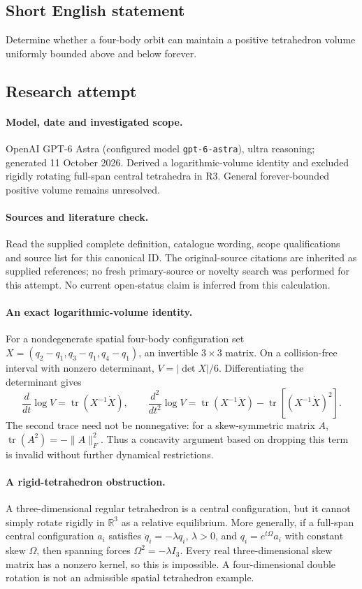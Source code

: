 \documentclass[11pt]{article}
\begin{document}
\subsection{Short English statement}
Determine whether a four-body orbit can maintain a positive tetrahedron volume uniformly bounded above and below forever.
\subsection{Research attempt}
\paragraph{Model, date and investigated scope.}
OpenAI GPT-6 Astra (configured model \texttt{gpt-6-astra}), ultra reasoning; generated 11 October 2026. Derived a logarithmic-volume identity and excluded rigidly rotating full-span central tetrahedra in R3. General forever-bounded positive volume remains unresolved.

\paragraph{Sources and literature check.}
Read the supplied complete definition, catalogue wording, scope qualifications and source list for this canonical ID. The original-source citations are inherited as supplied references; no fresh primary-source or novelty search was performed for this attempt. No current open-status claim is inferred from this calculation.

\paragraph{An exact logarithmic-volume identity.}For a nondegenerate spatial four-body configuration set \(X=(q_2-q_1,q_3-q_1,q_4-q_1)\), an invertible \(3\times3\) matrix. On a collision-free interval with nonzero determinant, \(V=|\det X|/6\). Differentiating the determinant gives
\[\frac{d}{dt}\log V=\operatorname{tr}(X^{-1}\dot X),\qquad
\frac{d^2}{dt^2}\log V=\operatorname{tr}(X^{-1}\ddot X)-\operatorname{tr}[(X^{-1}\dot X)^2].
\]
The second trace need not be nonnegative: for a skew-symmetric matrix \(A\), \(\operatorname{tr}(A^2)=-\|A\|_F^2\). Thus a concavity argument based on dropping this term is invalid without further dynamical restrictions.
\paragraph{A rigid-tetrahedron obstruction.}A three-dimensional regular tetrahedron is a central configuration, but it cannot simply rotate rigidly in \(\mathbb R^3\) as a relative equilibrium. More generally, if a full-span central configuration \(a_i\) satisfies \(\ddot q_i=-\lambda q_i\), \(\lambda>0\), and \(q_i=e^{t\Omega}a_i\) with constant skew \(\Omega\), then spanning forces \(\Omega^2=-\lambda I_3\). Every real three-dimensional skew matrix has a nonzero kernel, so this is impossible. A four-dimensional double rotation is not an admissible spatial tetrahedron example.
\end{document}
